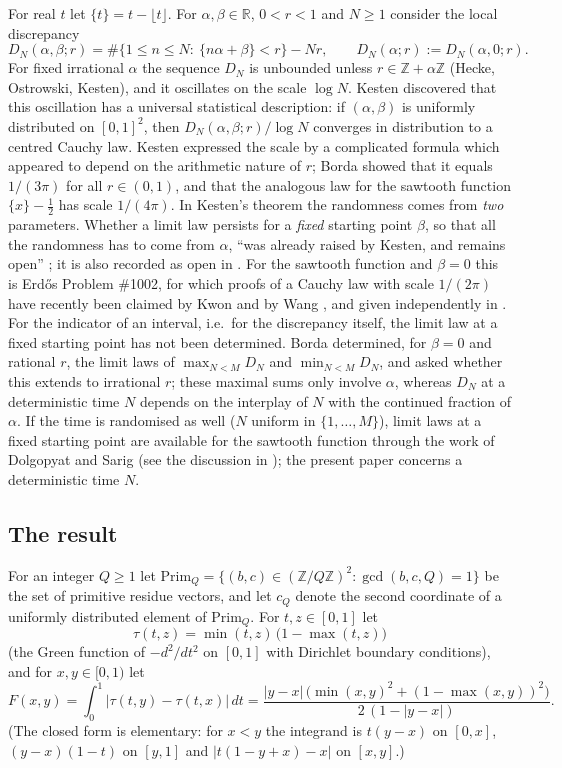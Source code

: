 \documentclass[11pt]{amsart}
\theoremstyle{definition}
\numberwithin{equation}{section}
\newcommand{\R}{\mathbb{R}}
\newcommand{\Z}{\mathbb{Z}}
\newcommand{\fr}[1]{\{#1\}}
\newcommand{\Prim}{\mathrm{Prim}}
\begin{document}
For real $t$ let $\fr{t}=t-\lfloor t\rfloor$. For $\alpha,\beta\in\R$, $0<r<1$ and $N\ge1$ consider the local discrepancy
\[
D_N(\alpha,\beta;r)=\#\{1\le n\le N:\ \fr{n\alpha+\beta}<r\}-Nr ,\qquad D_N(\alpha;r):=D_N(\alpha,0;r).
\]
For fixed irrational $\alpha$ the sequence $D_N$ is unbounded unless $r\in\Z+\alpha\Z$ (Hecke, Ostrowski, Kesten), and it oscillates on the
scale $\log N$. Kesten \cite{Ke60} discovered that this oscillation has a universal statistical description: if $(\alpha,\beta)$ is uniformly
distributed on $[0,1]^2$, then $D_N(\alpha,\beta;r)/\log N$ converges in distribution to a centred Cauchy law. Kesten expressed the scale
by a complicated formula which appeared to depend on the arithmetic nature of $r$; Borda \cite{Bo25} showed that it equals $1/(3\pi)$ for all
$r\in(0,1)$, and that the analogous law for the sawtooth function $\fr{x}-\frac12$ has scale $1/(4\pi)$. In Kesten's theorem the
randomness comes from \emph{two} parameters. Whether a limit law persists for a \emph{fixed} starting point $\beta$, so that all the
randomness has to come from $\alpha$, ``was already raised by Kesten, and remains open'' \cite{Bo25}; it is also recorded as open in
\cite{Bo23a}.
For the sawtooth function and $\beta=0$ this is Erd\H{o}s Problem \#1002, for which proofs of a Cauchy law with scale $1/(2\pi)$ have
recently been claimed by Kwon and by Wang \cite{Kw26}, and given independently in \cite{E1002}. For the indicator of an interval, i.e.\
for the discrepancy itself, the limit law at a fixed starting point has not been determined. Borda \cite{Bo25} determined, for $\beta=0$ and rational $r$, the
limit laws of $\max_{N<M}D_N$ and $\min_{N<M}D_N$, and asked whether this extends to irrational $r$; these maximal sums only
involve $\alpha$, whereas $D_N$ at a deterministic time $N$ depends on the interplay of $N$ with the continued fraction of $\alpha$. If the time is
randomised as well ($N$ uniform in $\{1,\dots,M\}$), limit laws at a fixed starting point are available for the sawtooth function through the
work of Dolgopyat and Sarig \cite{DS20} (see the discussion in \cite{Bo23a}); the present paper concerns a deterministic time $N$.

\subsection*{The result}
For an integer $Q\ge1$ let $\Prim_Q=\{(b,c)\in(\Z/Q\Z)^2:\gcd(b,c,Q)=1\}$ be the set of primitive residue vectors, and let $c_Q$ denote the
second coordinate of a uniformly distributed element of $\Prim_Q$. For $t,z\in[0,1]$ let
\[
\tau(t,z)=\min(t,z)\,\big(1-\max(t,z)\big)
\]
(the Green function of $-d^2/dt^2$ on $[0,1]$ with Dirichlet boundary conditions), and for $x,y\in[0,1)$ let
\[
F(x,y)=\int_0^1\big|\tau(t,y)-\tau(t,x)\big|\,dt=\frac{|y-x|\,\big(\min(x,y)^2+(1-\max(x,y))^2\big)}{2\,(1-|y-x|)} .
\]
(The closed form is elementary: for $x<y$ the integrand is $t(y-x)$ on $[0,x]$, $(y-x)(1-t)$ on $[y,1]$ and $|t(1-y+x)-x|$ on $[x,y]$.)
\end{document}
